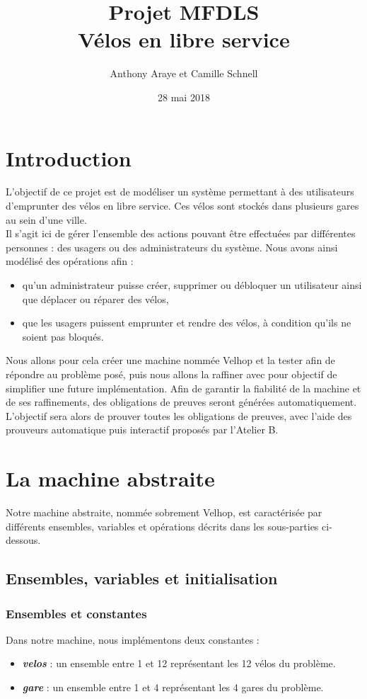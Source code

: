 \documentclass[12pt]{article}
\title{Projet MFDLS \\ Vélos en libre service}
\author{Anthony Araye et Camille Schnell}
\date{28 mai 2018}
\begin{document}
\maketitle
\newpage
\renewcommand{\contentsname}{Sommaire}
\tableofcontents
\newpage
\section{Introduction}
L'objectif de ce projet est de modéliser un système permettant à des utilisateurs d'emprunter des vélos en libre service. Ces vélos sont stockés dans plusieurs gares au sein d'une ville. \\

Il s'agit ici de gérer l'ensemble des actions pouvant être effectuées par différentes personnes : des usagers ou des administrateurs du système. Nous avons ainsi modélisé des opérations afin :
\begin{itemize}
  \item qu'un administrateur puisse créer, supprimer ou débloquer un utilisateur ainsi que déplacer ou réparer des vélos,
  \item que les usagers puissent emprunter et rendre des vélos, à condition qu'ils ne soient pas bloqués.
\end{itemize}

Nous allons pour cela créer une machine nommée Velhop et la tester afin de répondre au problème posé, puis nous allons la raffiner avec pour objectif de simplifier une future implémentation. Afin de garantir la fiabilité de la machine et de ses raffinements, des obligations de preuves seront générées automatiquement. L'objectif sera alors de prouver toutes les obligations de preuves, avec l'aide des prouveurs automatique puis interactif proposés par l'Atelier B.\\
\newpage
\section{La machine abstraite}
Notre machine abstraite, nommée sobrement Velhop, est caractérisée par différents ensembles, variables et opérations décrits dans les sous-parties ci-dessous.
\subsection{Ensembles, variables et initialisation}
\subsubsection{Ensembles et constantes}
Dans notre machine, nous implémentons deux constantes :
\begin{itemize}
  \item \textit{\textbf{velos}} : un ensemble entre 1 et 12 représentant les 12 vélos du problème.
  \item \textit{\textbf{gare}} : un ensemble entre 1 et 4 représentant les 4 gares du problème.
\end{itemize}
\end{document}
